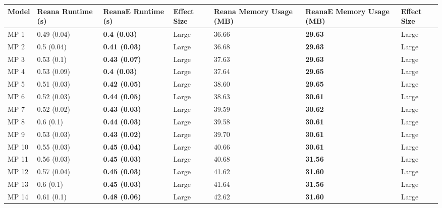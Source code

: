 \begin{tabular}{lllllll}
\toprule
 Model & Reana Runtime (s) &    ReanaE Runtime (s) & Effect Size & Reana Memory Usage (MB) & ReanaE Memory Usage (MB) & Effect Size \\
\midrule
  MP 1 &       0.49 (0.04) &   \textbf{0.4 (0.03)} &       Large &                   36.66 &           \textbf{29.63} &       Large \\
  MP 2 &        0.5 (0.04) &  \textbf{0.41 (0.03)} &       Large &                   36.68 &           \textbf{29.63} &       Large \\
  MP 3 &        0.53 (0.1) &  \textbf{0.43 (0.07)} &       Large &                   37.63 &           \textbf{29.63} &       Large \\
  MP 4 &       0.53 (0.09) &   \textbf{0.4 (0.03)} &       Large &                   37.64 &           \textbf{29.65} &       Large \\
  MP 5 &       0.51 (0.03) &  \textbf{0.42 (0.05)} &       Large &                   38.60 &           \textbf{29.65} &       Large \\
  MP 6 &       0.52 (0.03) &  \textbf{0.44 (0.05)} &       Large &                   38.63 &           \textbf{30.61} &       Large \\
  MP 7 &       0.52 (0.02) &  \textbf{0.43 (0.03)} &       Large &                   39.59 &           \textbf{30.62} &       Large \\
  MP 8 &         0.6 (0.1) &  \textbf{0.44 (0.03)} &       Large &                   39.58 &           \textbf{30.61} &       Large \\
  MP 9 &       0.53 (0.03) &  \textbf{0.43 (0.02)} &       Large &                   39.70 &           \textbf{30.61} &       Large \\
 MP 10 &       0.55 (0.03) &  \textbf{0.45 (0.04)} &       Large &                   40.66 &           \textbf{30.61} &       Large \\
 MP 11 &       0.56 (0.03) &  \textbf{0.45 (0.03)} &       Large &                   40.68 &           \textbf{31.56} &       Large \\
 MP 12 &       0.57 (0.04) &  \textbf{0.45 (0.03)} &       Large &                   41.62 &           \textbf{31.60} &       Large \\
 MP 13 &         0.6 (0.1) &  \textbf{0.45 (0.03)} &       Large &                   41.64 &           \textbf{31.56} &       Large \\
 MP 14 &        0.61 (0.1) &  \textbf{0.48 (0.06)} &       Large &                   42.62 &           \textbf{31.60} &       Large \\

\end{tabular}
